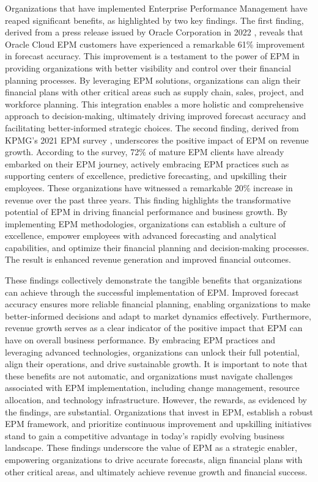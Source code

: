 \documentclass[12pt,a4paper,openright,twoside]{book}
\begin{document}
Organizations that have implemented Enterprise Performance Management have reaped significant benefits, as highlighted by two key findings. 
%
The first finding, derived from a press release issued by Oracle Corporation in 2022 \cite{toomey2022oracle}, reveals that Oracle Cloud EPM customers have experienced a remarkable 61\% improvement in forecast accuracy. 
%
This improvement is a testament to the power of EPM in providing organizations with better visibility and control over their financial planning processes. 
%
By leveraging EPM solutions, organizations can align their financial plans with other critical areas such as supply chain, sales, project, and workforce planning. 
%
This integration enables a more holistic and comprehensive approach to decision-making, ultimately driving improved forecast accuracy and facilitating better-informed strategic choices.
%
The second finding, derived from KPMG's 2021 EPM survey \cite{kpmg2021survey}, underscores the positive impact of EPM on revenue growth. 
%
According to the survey, 72\% of mature EPM clients have already embarked on their EPM journey, actively embracing EPM practices such as supporting centers of excellence, predictive forecasting, and upskilling their employees. 
%
These organizations have witnessed a remarkable 20\% increase in revenue over the past three years. 
%
This finding highlights the transformative potential of EPM in driving financial performance and business growth. 
%
By implementing EPM methodologies, organizations can establish a culture of excellence, empower employees with advanced forecasting and analytical capabilities, and optimize their financial planning and decision-making processes. 
%
The result is enhanced revenue generation and improved financial outcomes.

These findings collectively demonstrate the tangible benefits that organizations can achieve through the successful implementation of EPM. 
%
Improved forecast accuracy ensures more reliable financial planning, enabling organizations to make better-informed decisions and adapt to market dynamics effectively. 
%
Furthermore, revenue growth serves as a clear indicator of the positive impact that EPM can have on overall business performance. 
%
By embracing EPM practices and leveraging advanced technologies, organizations can unlock their full potential, align their operations, and drive sustainable growth.
%
It is important to note that these benefits are not automatic, and organizations must navigate challenges associated with EPM implementation, including change management, resource allocation, and technology infrastructure. 
%
However, the rewards, as evidenced by the findings, are substantial. 
%
Organizations that invest in EPM, establish a robust EPM framework, and prioritize continuous improvement and upskilling initiatives stand to gain a competitive advantage in today's rapidly evolving business landscape. 
%
These findings underscore the value of EPM as a strategic enabler, empowering organizations to drive accurate forecasts, align financial plans with other critical areas, and ultimately achieve revenue growth and financial success.
\end{document}
